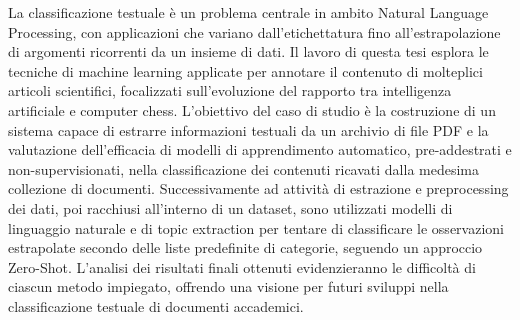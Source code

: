 La classificazione testuale è un problema centrale in ambito Natural Language Processing, con applicazioni che variano dall'etichettatura fino all'estrapolazione di argomenti ricorrenti da un insieme di dati. Il lavoro di questa tesi esplora le tecniche di machine learning applicate per annotare il contenuto di molteplici articoli scientifici, focalizzati sull'evoluzione del rapporto tra intelligenza artificiale e computer chess. L'obiettivo del caso di studio è la costruzione di un sistema capace di estrarre informazioni testuali da un archivio di file PDF e la valutazione dell'efficacia di modelli di apprendimento automatico, pre-addestrati e non-supervisionati, nella classificazione dei contenuti ricavati dalla medesima collezione di documenti. Successivamente ad attività di estrazione e preprocessing dei dati, poi racchiusi all'interno di un dataset, sono utilizzati modelli di linguaggio naturale e di topic extraction per tentare di classificare le osservazioni estrapolate secondo delle liste predefinite di categorie, seguendo un approccio Zero-Shot. L'analisi dei risultati finali ottenuti evidenzieranno le difficoltà di ciascun metodo impiegato, offrendo una visione per futuri sviluppi nella classificazione testuale di documenti accademici.